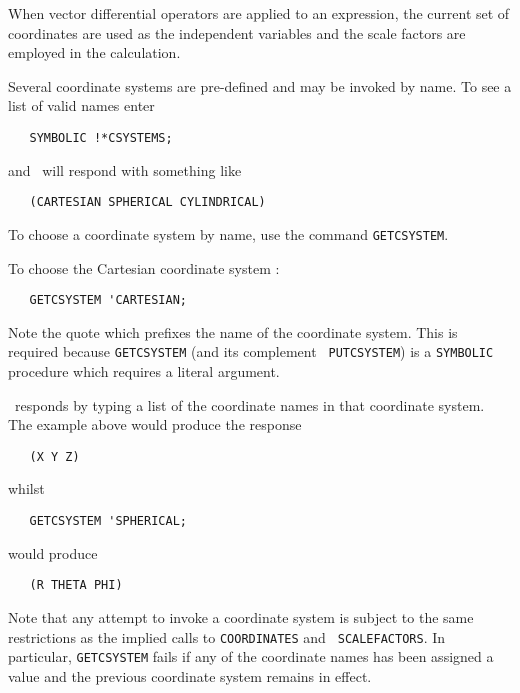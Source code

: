 When vector differential operators are applied to an expression,
the current set of coordinates are used as the independent
variables and the scale factors are employed in the calculation.


Several coordinate systems are pre-defined and may be invoked by
name. To see a list of valid names enter

\begin{verbatim}
   SYMBOLIC !*CSYSTEMS;
\end{verbatim}

and \REDUCE\ will respond with something like

\begin{verbatim}
   (CARTESIAN SPHERICAL CYLINDRICAL)
\end{verbatim}

To choose a coordinate system by name, use the command {\tt GETCSYSTEM}.

To choose the Cartesian coordinate system :
\begin{verbatim}
   GETCSYSTEM 'CARTESIAN;
\end{verbatim}

Note the quote which prefixes the name of the coordinate system. This
is required because {\tt GETCSYSTEM} (and its complement {\tt
PUTCSYSTEM}) is a {\tt SYMBOLIC} procedure which requires a literal
argument.

\REDUCE\ responds by typing a list of the coordinate names in that
coordinate system. The example above would produce the response

\begin{verbatim}
   (X Y Z)
\end{verbatim}

whilst

\begin{verbatim}
   GETCSYSTEM 'SPHERICAL;
\end{verbatim}

would produce

\begin{verbatim}
   (R THETA PHI)
\end{verbatim}

Note that any attempt to invoke a coordinate system is subject to the
same restrictions as the implied calls to {\tt COORDINATES} and {\tt
SCALEFACTORS}.  In particular, {\tt GETCSYSTEM} fails if any of the
coordinate names has been assigned a value and the previous coordinate
system remains in effect.

